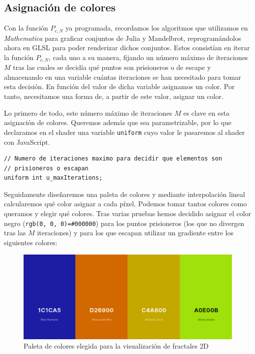 \subsection{Asignación de colores}
\label{subsection:colores}

Con la función $P_{c,N}$ ya programada, recordamos los algoritmos que utilizamos en \textit{Mathematica} para graficar conjuntos de Julia y Mandelbrot, reprogramándolos ahora en GLSL para poder renderizar dichos conjuntos. Estos consistían en iterar la función $P_{c,N}$, cada uno a su manera, fijando un número máximo de iteraciones $M$ tras las cuales se decidía qué puntos son prisioneros o de escape y almacenando en una variable cuántas iteraciones se han necesitado para tomar esta decisión. En función del valor de dicha variable asignamos un color. Por tanto, necesitamos una forma de, a partir de este valor, asignar un color.

Lo primero de todo, este número máximo de iteraciones $M$ es clave en esta asignación de colores. Queremos además que sea parametrizable, por lo que declaramos en el shader una variable \verb|uniform| cuyo valor le pasaremos al shader con JavaScript.

\begin{lstlisting}
// Numero de iteraciones maximo para decidir que elementos son
// prisioneros o escapan
uniform int u_maxIterations;
\end{lstlisting}

Seguidamente diseñaremos una paleta de colores y mediante interpolación lineal calcularemos qué color asignar a cada píxel. Podemos tomar tantos colores como queramos y elegir qué colores. Tras varias pruebas hemos decidido asignar el color negro (\verb|rgb(0, 0, 0)=#000000|) para los puntos prisioneros (los que no divergen tras las $M$ iteraciones) y para los que escapan utilizar un gradiente entre los siguientes colores:

\begin{figure} [ht]
    \centering
    \includegraphics[scale = 0.4]{img/C6/paleta.png}
    \caption{Paleta de colores elegida para la visualización de fractales 2D}
    \label{fig:paleta}
\end{figure}

